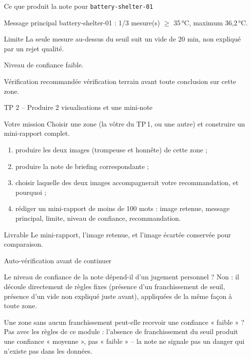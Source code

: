 \documentclass[aspectratio=169]{beamer}
\begin{document}
\begin{frame}{Ce que produit la note pour \texttt{battery-shelter-01}}
  \small
  \begin{block}{Message principal}
    battery-shelter-01 : 1/3 mesure(s) $\geq$ 35\,°C, maximum 36,2\,°C.
  \end{block}
  \begin{block}{Limite}
    La seule mesure au-dessus du seuil suit un vide de 20 min, non expliqué par un rejet qualité.
  \end{block}
  \begin{block}{Niveau de confiance}
    faible.
  \end{block}
  \begin{block}{Vérification recommandée}
    vérification terrain avant toute conclusion sur cette zone.
  \end{block}
\end{frame}

\begin{frame}{TP 2 -- Produire 2 visualisations et une mini-note}
  \begin{block}{Votre mission}
    Choisir une zone (la vôtre du TP\,1, ou une autre) et construire un mini-rapport complet.
  \end{block}
  \begin{enumerate}
    \item produire les deux images (trompeuse et honnête) de cette zone ;
    \item produire la note de briefing correspondante ;
    \item choisir laquelle des deux images accompagnerait votre recommandation, et pourquoi ;
    \item rédiger un mini-rapport de moins de 100 mots : image retenue, message principal, limite, niveau de confiance, recommandation.
  \end{enumerate}
  \begin{block}{Livrable}
    Le mini-rapport, l'image retenue, et l'image écartée conservée pour comparaison.
  \end{block}
\end{frame}

\begin{frame}{Auto-vérification avant de continuer}
  \small
  \begin{block}{Le niveau de confiance de la note dépend-il d'un jugement personnel ?}
    Non : il découle directement de règles fixes (présence d'un franchissement de seuil, présence d'un vide non expliqué juste avant), appliquées de la même façon à toute zone.
  \end{block}
  \begin{block}{Une zone sans aucun franchissement peut-elle recevoir une confiance « faible » ?}
    Pas avec les règles de ce module : l'absence de franchissement du seuil produit une confiance « moyenne », pas « faible » -- la note ne signale pas un danger qui n'existe pas dans les données.
  \end{block}
\end{frame}
\end{document}
